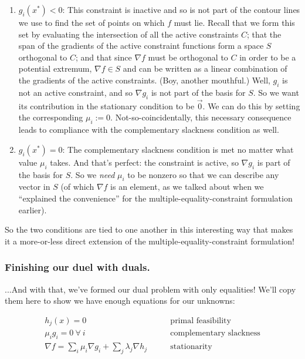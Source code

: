 \documentclass[letterpaper,12pt]{report}
\providecommand{\tightlist}{%
  \setlength{\itemsep}{0pt}\setlength{\parskip}{0pt}}
\begin{document}
\begin{enumerate}
\item
  \(g_i(x^*) < 0\): This constraint is inactive and so is not part of
  the contour lines we use to find the set of points on which \(f\) must
  lie. Recall that we form this set by evaluating the intersection of
  all the active constraints \(C\); that the span of the gradients of
  the active constraint functions form a space \(S\) orthogonal to
  \(C\); and that since \(\nabla f\) must be orthogonal to \(C\) in
  order to be a potential extremum, \(\nabla f \in S\) and can be
  written as a linear combination of the gradients of the active
  constraints. (Boy, another mouthful.) Well, \(g_i\) is not an active
  constraint, and so \(\nabla g_i\) is not part of the basis for \(S\).
  So we want its contribution in the stationary condition to be
  \(\vec{0}\). We can do this by setting the corresponding
  \(\mu_i := 0\). Not-so-coincidentally, this necessary consequence
  leads to compliance with the complementary slackness condition as
  well.
\item
  \(g_i(x^*) = 0\): The complementary slackness condition is met no
  matter what value \(\mu_i\) takes. And that's perfect: the constraint
  is active, so \(\nabla g_i\) is part of the basis for \(S\). So we
  \emph{need} \(\mu_i\) to be nonzero so that we can describe any vector
  in \(S\) (of which \(\nabla f\) is an element, as we talked about when
  we ``explained the convenience'' for the multiple-equality-constraint
  formulation earlier).
\end{enumerate}

So the two conditions are tied to one another in this interesting way
that makes it a more-or-less direct extension of the
multiple-equality-constraint formulation!

\subsubsection{Finishing our duel with
duals.}\label{finishing-our-duel-with-duals.}

...And with that, we've formed our dual problem with only equalities!
We'll copy them here to show we have enough equations for our unknowns:

\[\begin{split} h_j(x) = 0 \qquad            & \text{primal feasibility} \\
\mu_i g_i = 0 \ \forall \ i \qquad           &\text{complementary slackness} \\
\nabla f = \sum _i \mu _i \nabla g_i + \sum _j \lambda _j \nabla h_j \qquad & \text{stationarity}\end{split}\]
\end{document}
